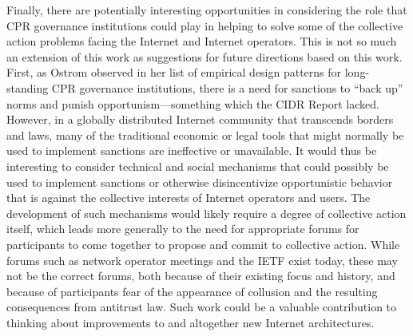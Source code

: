 Finally, there are potentially interesting opportunities in considering the
role that CPR governance institutions could play in helping to solve some of
the collective action problems facing the Internet and Internet operators. This
is not so much an extension of this work as suggestions for future directions
based on this work. First, as Ostrom observed in her list of empirical design
patterns for long-standing CPR governance institutions, there is a need for
sanctions to ``back up'' norms and punish opportunism---something which the
CIDR Report lacked. However, in a globally distributed Internet community that
transcends borders and laws, many of the traditional economic or legal tools
that might normally be used to implement sanctions are ineffective or
unavailable. It would thus be interesting to consider technical and social
mechanisms that could possibly be used to implement sanctions or otherwise
disincentivize opportunistic behavior that is against the collective interests
of Internet operators and users. The development of such mechanisms would
likely require a degree of collective action itself, which leads more generally
to the need for appropriate forums for participants to come together to propose
and commit to collective action. While forums such as network operator meetings
and the IETF exist today, these may not be the correct forums, both because of
their existing focus and history, and because of participants fear of the
appearance of collusion and the resulting consequences from antitrust law.
Such work could be a valuable contribution to thinking about improvements to
and altogether new Internet architectures.







